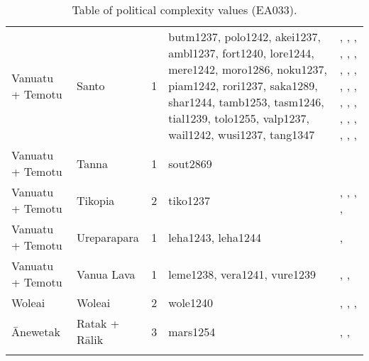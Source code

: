 \begin{longtable}{p{4.5cm}p{2cm}p{2cm}p{2cm}p{4cm}}
  Vanuatu + Temotu & Santo & 1 & butm1237, polo1242, akei1237, ambl1237, fort1240, lore1244, mere1242, moro1286, noku1237, piam1242, rori1237, saka1289, shar1244, tamb1253, tasm1246, tial1239, tolo1255, valp1237, wail1242, wusi1237, tang1347 & \citet{bonnemaison1996power}, \citet{bonnemaison1996power}, \citet{bonnemaison1996power}, \citet{bonnemaison1996power}, \citet{bonnemaison1996power}, \citet{bonnemaison1996power}, \citet{bonnemaison1996power}, \citet{bonnemaison1996power}, \citet{bonnemaison1996power}, \citet{bonnemaison1996power}, \citet{bonnemaison1996power}, \citet{bonnemaison1996power}, \citet{bonnemaison1996power}, \citet{bonnemaison1996power}, \citet{bonnemaison1996power}, \citet{bonnemaison1996power}, \citet{bonnemaison1996power}, \citet{bonnemaison1996power}, \citet{bonnemaison1996power}, \citet{bonnemaison1996power}, \citet{bonnemaison1996power}, \citet{bonnemaison1996power} \\ 
  Vanuatu + Temotu & Tanna & 1 & sout2869 & \citet{lindstroem1991} \\ 
  Vanuatu + Temotu & Tikopia & 2 & tiko1237 & \citet{kirch1994wet}, \citet{sahlins1958social}, \citet{firth1939primitive}, \citet{firth1959social}, \citet{firth1991} \\ 
  Vanuatu + Temotu & Ureparapara & 1 & leha1243, leha1244 & \citet{bonnemaison1996power}, \citet{bonnemaison1996power} \\ 
  Vanuatu + Temotu & Vanua Lava & 1 & leme1238, vera1241, vure1239 & \citet{bonnemaison1996power}, \citet{bonnemaison1996power}, \citet{bonnemaison1996power} \\ 
  Woleai & Woleai & 2 & wole1240 & \citet{alkire1991woleai}, \citet{alkire1991woleai}, \citet{burrowsandspiro1953}, \citet{burrowsandspiro1953} \\ 
  Ānewetak & Ratak + Rālik & 3 & mars1254 & \citet{carruci1991marshall}, \citet{erdland1914}, \citet{williamson_1982} \\ 
   \bottomrule
\caption{Table of political complexity values (EA033).} 
\label{appendix_pol_complex_xtable}
\end{longtable}
